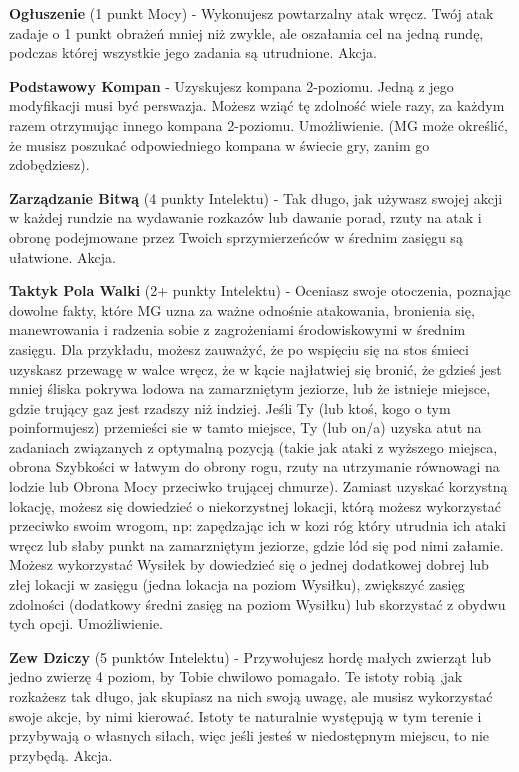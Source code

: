 \textbf{Ogłuszenie}\label{sec:Ogłuszenie} (1 punkt Mocy) - Wykonujesz powtarzalny atak wręcz. Twój atak zadaje o 1 punkt obrażeń mniej niż zwykle, ale oszałamia cel na jedną rundę, podczas której wszystkie jego zadania są utrudnione. Akcja.

\textbf{Podstawowy Kompan}\label{sec:Podstawowy Kompan} - Uzyskujesz kompana 2-poziomu. Jedną z jego modyfikacji musi być perswazja. Możesz wziąć tę zdolność wiele razy, za każdym razem otrzymując innego kompana 2-poziomu. Umożliwienie. (MG może określić, że musisz poszukać odpowiedniego kompana w świecie gry, zanim go zdobędziesz).

\textbf{Zarządzanie Bitwą}\label{sec:Zarządzanie Bitwą} (4 punkty Intelektu) - Tak długo, jak używasz swojej akcji w każdej rundzie na wydawanie rozkazów lub dawanie porad, rzuty na atak i obronę podejmowane przez Twoich sprzymierzeńców w średnim zasięgu są ułatwione. Akcja.

\textbf{Taktyk Pola Walki}\label{sec:Taktyk Pola Walki} (2+ punkty Intelektu) - Oceniasz swoje otoczenia, poznając dowolne fakty, które MG uzna za ważne odnośnie atakowania, bronienia się, manewrowania i radzenia sobie z zagrożeniami środowiskowymi w średnim zasięgu. Dla przykładu, możesz zauważyć, że po wspięciu się na stos śmieci uzyskasz przewagę w walce wręcz, że w kącie najłatwiej się bronić, że gdzieś jest mniej śliska pokrywa lodowa na zamarzniętym jeziorze, lub że istnieje miejsce, gdzie trujący gaz jest rzadszy niż indziej. Jeśli Ty (lub ktoś, kogo o tym poinformujesz) przemieści sie w tamto miejsce, Ty (lub on/a) uzyska atut na zadaniach związanych z optymalną pozycją (takie jak ataki z wyższego miejsca, obrona Szybkości w łatwym do obrony rogu, rzuty na utrzymanie równowagi na lodzie lub Obrona Mocy przeciwko trującej chmurze). Zamiast uzyskać korzystną lokację, możesz się dowiedzieć o niekorzystnej lokacji, którą możesz wykorzystać przeciwko swoim wrogom, np: zapędzając ich w kozi róg który utrudnia ich ataki wręcz lub słaby punkt na zamarzniętym jeziorze, gdzie lód się pod nimi załamie. Możesz wykorzystać Wysiłek by dowiedzieć się o jednej dodatkowej dobrej lub złej lokacji w zasięgu (jedna lokacja na poziom Wysiłku), zwiększyć zasięg zdolności (dodatkowy średni zasięg na poziom Wysiłku) lub skorzystać z obydwu tych opcji. Umożliwienie. 

\textbf{Zew Dziczy}\label{sec:Zew Dziczy} (5 punktów Intelektu) - Przywołujesz hordę małych zwierząt lub jedno zwierzę 4 poziom, by Tobie chwilowo pomagało. Te istoty robią ,jak rozkażesz tak długo, jak skupiasz na nich swoją uwagę, ale musisz wykorzystać swoje akcje, by nimi kierować. Istoty te naturalnie występują w tym terenie i przybywają o własnych siłach, więc jeśli jesteś w niedostępnym miejscu, to nie przybędą. Akcja.

